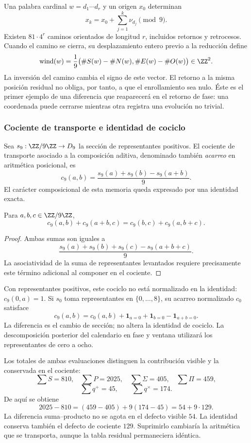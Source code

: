 Una palabra cardinal \(w=d_1\cdots d_r\) y un origen \(x_0\) determinan
\[
 x_k=x_0+\sum_{j=1}^k\nu_{d_j}\pmod9.
\]
Existen \(81\cdot4^r\) caminos orientados de longitud \(r\), incluidos retornos y retrocesos. Cuando el camino se cierra, su desplazamiento entero previo a la reducción define
\begin{equation}
 \operatorname{wind}(w)=\frac19
 \bigl(\#S(w)-\#N(w),\#E(w)-\#O(w)\bigr)\in\ZZ^2.
\end{equation}
La inversión del camino cambia el signo de este vector. El retorno a la misma posición residual no obliga, por tanto, a que el enrollamiento sea nulo. Éste es el primer ejemplo de una diferencia que reaparecerá en el retorno de fase: una coordenada puede cerrarse mientras otra registra una evolución no trivial.

\subsubsection{Cociente de transporte e identidad de cociclo}

Sea \(s_9:\ZZ/9\ZZ\to D_9\) la sección de representantes positivos. El cociente de transporte asociado a la composición aditiva, denominado también \emph{acarreo} en aritmética posicional, es
\[
 c_9(a,b)=\frac{s_9(a)+s_9(b)-s_9(a+b)}9.
\]
El carácter composicional de esta memoria queda expresado por una identidad exacta.

\begin{lemma}
Para \(a,b,c\in\ZZ/9\ZZ\),
\[
 c_9(a,b)+c_9(a+b,c)=c_9(b,c)+c_9(a,b+c).
\]
\end{lemma}
\begin{proof}
Ambas sumas son iguales a
\[
 \frac{s_9(a)+s_9(b)+s_9(c)-s_9(a+b+c)}9.
\]
La asociatividad de la suma de representantes levantados requiere precisamente este término adicional al componer en el cociente.
\end{proof}

Con representantes positivos, este cociclo no está normalizado en la identidad: \(c_9(0,a)=1\). Si \(s_0\) toma representantes en \(\{0,\ldots,8\}\), su acarreo normalizado \(c_0\) satisface
\[
 c_9(a,b)=c_0(a,b)+\mathbf1_{a=0}+\mathbf1_{b=0}-\mathbf1_{a+b=0}.
\]
La diferencia es el cambio de sección; no altera la identidad de cociclo. La descomposición posterior del calendario en fase y ventana utilizará los representantes de cero a ocho.

Los totales de ambas evaluaciones distinguen la contribución visible y la conservada en el cociente:
\[
 \sum S=810,\quad\sum P=2025,\quad
 \sum\Sigma=405,\quad\sum\Pi=459,
\]
\[
 \sum q^+=45,\qquad\sum q^\times=174.
\]
De aquí se obtiene
\begin{equation}
 2025-810=(459-405)+9(174-45)=54+9\cdot129.
 \label{eq:defecto-integrado}
\end{equation}
La diferencia suma--producto no se agota en el defecto visible \(54\). La identidad conserva también el defecto de cociente \(129\). Suprimirlo cambiaría la aritmética que se transporta, aunque la tabla residual permaneciera idéntica.

